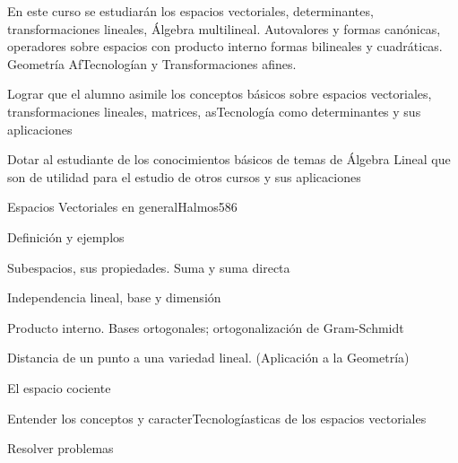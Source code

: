 \begin{syllabus}


\begin{justification}
En este curso se estudiarán los espacios vectoriales, determinantes, transformaciones lineales, Álgebra multilineal.
Autovalores y formas canónicas, operadores sobre espacios con producto interno formas bilineales y cuadráticas. Geometría AfTecnologían y Transformaciones afines.
\end{justification}

\begin{goals}
\item  Lograr que el alumno asimile los conceptos básicos sobre espacios vectoriales, transformaciones lineales, matrices, asTecnología como determinantes y sus aplicaciones
\item  Dotar al estudiante de los conocimientos básicos de temas de Álgebra Lineal que son de utilidad para el estudio de otros cursos y sus aplicaciones
\end{goals}

\begin{outcomes}
\end{outcomes}

\begin{unit}{Espacios Vectoriales en general}{Halmos58}{6}
   \begin{topics}
         \item  Definición y ejemplos
	 \item  Subespacios, sus propiedades. Suma y suma directa
         \item  Independencia lineal, base y dimensión
	 \item  Producto interno. Bases ortogonales; ortogonalización de Gram-Schmidt
         \item  Distancia de un punto a una variedad lineal. (Aplicación a la Geometría)
         \item  El espacio cociente
   \end{topics}

   \begin{unitgoals}
         \item  Entender los conceptos y caracterTecnologíasticas de los espacios vectoriales
         \item  Resolver problemas
   \end{unitgoals}
\end{unit}


\end{syllabus}
